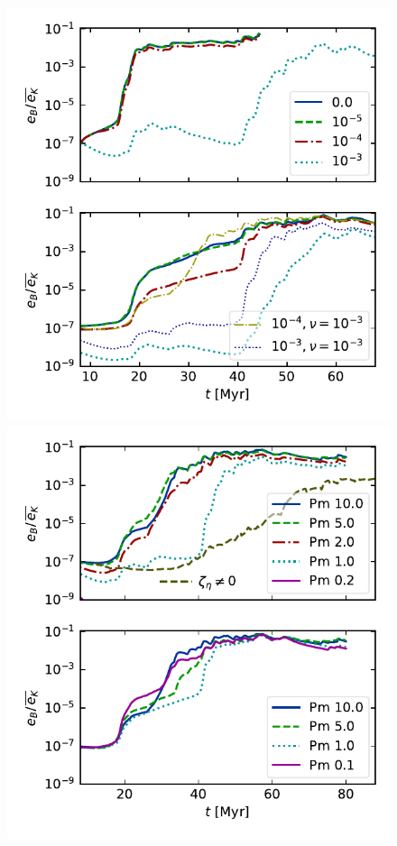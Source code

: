 \documentclass[preprint2]{aastex63}
\begin{document}
\begin{figure}
  \includegraphics[trim=0.5cm 0.0cm 0.3cm 0.0cm, clip=true,width=\columnwidth]{figs/1pc-eB-nu0.pdf}
  \includegraphics[trim=0.5cm 0.0cm 0.3cm 0.0cm, clip=true,width=\columnwidth]{figs/1pc-eB-nu6.pdf}\\

\end{figure}
\end{document}
